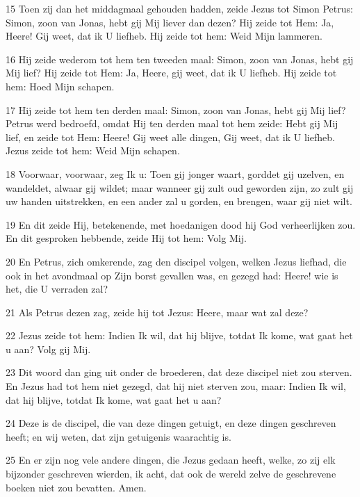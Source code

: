 \par 15 Toen zij dan het middagmaal gehouden hadden, zeide Jezus tot Simon Petrus: Simon, zoon van Jonas, hebt gij Mij liever dan dezen? Hij zeide tot Hem: Ja, Heere! Gij weet, dat ik U liefheb. Hij zeide tot hem: Weid Mijn lammeren.
\par 16 Hij zeide wederom tot hem ten tweeden maal: Simon, zoon van Jonas, hebt gij Mij lief? Hij zeide tot Hem: Ja, Heere, gij weet, dat ik U liefheb. Hij zeide tot hem: Hoed Mijn schapen.
\par 17 Hij zeide tot hem ten derden maal: Simon, zoon van Jonas, hebt gij Mij lief? Petrus werd bedroefd, omdat Hij ten derden maal tot hem zeide: Hebt gij Mij lief, en zeide tot Hem: Heere! Gij weet alle dingen, Gij weet, dat ik U liefheb. Jezus zeide tot hem: Weid Mijn schapen.
\par 18 Voorwaar, voorwaar, zeg Ik u: Toen gij jonger waart, gorddet gij uzelven, en wandeldet, alwaar gij wildet; maar wanneer gij zult oud geworden zijn, zo zult gij uw handen uitstrekken, en een ander zal u gorden, en brengen, waar gij niet wilt.
\par 19 En dit zeide Hij, betekenende, met hoedanigen dood hij God verheerlijken zou. En dit gesproken hebbende, zeide Hij tot hem: Volg Mij.
\par 20 En Petrus, zich omkerende, zag den discipel volgen, welken Jezus liefhad, die ook in het avondmaal op Zijn borst gevallen was, en gezegd had: Heere! wie is het, die U verraden zal?
\par 21 Als Petrus dezen zag, zeide hij tot Jezus: Heere, maar wat zal deze?
\par 22 Jezus zeide tot hem: Indien Ik wil, dat hij blijve, totdat Ik kome, wat gaat het u aan? Volg gij Mij.
\par 23 Dit woord dan ging uit onder de broederen, dat deze discipel niet zou sterven. En Jezus had tot hem niet gezegd, dat hij niet sterven zou, maar: Indien Ik wil, dat hij blijve, totdat Ik kome, wat gaat het u aan?
\par 24 Deze is de discipel, die van deze dingen getuigt, en deze dingen geschreven heeft; en wij weten, dat zijn getuigenis waarachtig is.
\par 25 En er zijn nog vele andere dingen, die Jezus gedaan heeft, welke, zo zij elk bijzonder geschreven wierden, ik acht, dat ook de wereld zelve de geschrevene boeken niet zou bevatten. Amen.




